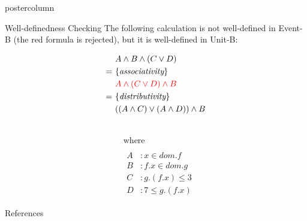 \documentclass{beamer}
\begin{document}
\begin{frame}
\begin{columns}
\begin{column}{.3\textwidth}
\begin{beamercolorbox}[center]{postercolumn}
\begin{minipage}{.98\textwidth}
{\begin{myblock}{Well-definedness Checking}
            The following calculation is not well-defined in Event-B (the
            {\color{red}red} formula is rejected), but it is well-defined
            in Unit-B:\

            \vspace{-2ex}
            \begin{multicols}{2}
              \begin{align*}
                & A \wedge B \wedge (C \vee D) \\
                = \ & \{ \textit{associativity} \} \\
                & {\color{red} A \wedge (C \vee D) \wedge B} \\
                = \ & \{ \textit{distributivity} \} \\
                & ( (A \wedge C) \vee (A \wedge D) ) \wedge B
              \end{align*}
              \columnbreak\
              \begin{align*}
                \\[-1.1ex]
                & \text{where} \\
                \\[-2.9ex]
                & \begin{array}{ll}
                    A &: x \in dom.f \\
                    B &: f.x \in dom.g \\
                    C &: g.(f.x) \le 3  \\
                    D &: 7 \le g.(f.x)
                  \end{array}
              \end{align*}
            \end{multicols}
            \vspace{-2.8ex}
          \end{myblock}
          \begin{myblock}{References}
            \footnotesize
            
            
          \end{myblock}\vfill
    }\end{minipage}\end{beamercolorbox}
  \end{column}
\end{columns}
\end{frame}
\end{document}
